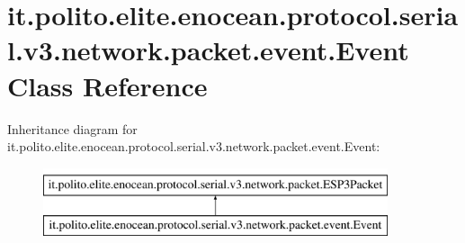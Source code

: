 \hypertarget{classit_1_1polito_1_1elite_1_1enocean_1_1protocol_1_1serial_1_1v3_1_1network_1_1packet_1_1event_1_1_event}{}\section{it.\+polito.\+elite.\+enocean.\+protocol.\+serial.\+v3.\+network.\+packet.\+event.\+Event Class Reference}
\label{classit_1_1polito_1_1elite_1_1enocean_1_1protocol_1_1serial_1_1v3_1_1network_1_1packet_1_1event_1_1_event}
Inheritance diagram for it.\+polito.\+elite.\+enocean.\+protocol.\+serial.\+v3.\+network.\+packet.\+event.\+Event\+:\begin{figure}[H]
\begin{center}
\leavevmode
\includegraphics[height=2.000000cm]{classit_1_1polito_1_1elite_1_1enocean_1_1protocol_1_1serial_1_1v3_1_1network_1_1packet_1_1event_1_1_event}
\end{center}
\end{figure}
